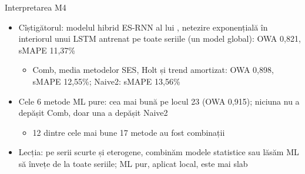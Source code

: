 \begin{frame}{Interpretarea M4}
\itemsize{\small}
\begin{itemize}
    \item Cîștigătorul: modelul hibrid ES-RNN al lui , netezire exponențială în interiorul unui LSTM antrenat pe toate seriile (un model global): OWA 0{,}821, sMAPE 11{,}37\%
    \begin{itemize}
        \item Comb, media metodelor SES, Holt și trend amortizat: OWA 0{,}898, sMAPE 12{,}55\%; Naive2: sMAPE 13{,}56\%
    \end{itemize}
    \item Cele 6 metode ML pure: cea mai bună pe locul 23 (OWA 0{,}915); niciuna nu a depășit Comb, doar una a depășit Naive2 
    \begin{itemize}
        \item 12 dintre cele mai bune 17 metode au fost combinații
    \end{itemize}
    \item Lecția: pe serii scurte și eterogene, combinăm modele statistice sau lăsăm ML să învețe de la toate seriile; ML pur, aplicat local, este mai slab
\end{itemize}
\end{frame}

